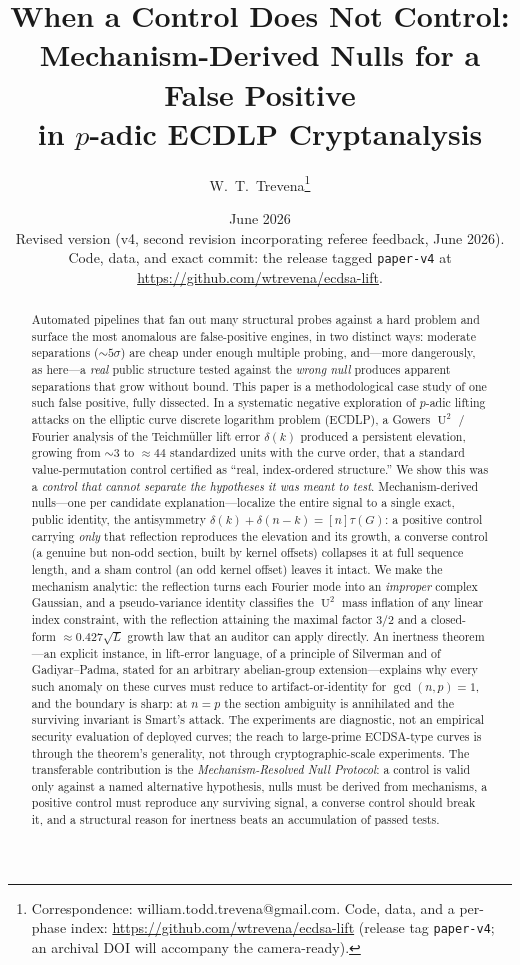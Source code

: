 \documentclass[11pt]{article}
\title{\bf When a Control Does Not Control:\\
Mechanism-Derived Nulls for a False Positive\\
in $p$-adic ECDLP Cryptanalysis}
\author{W.\ T.\ Trevena\thanks{Correspondence: william.todd.trevena@gmail.com.
Code, data, and a per-phase index:
\url{https://github.com/wtrevena/ecdsa-lift} (release tag
\texttt{paper-v4}; an archival DOI will accompany the camera-ready).}}
\date{June 2026\\[2pt]
{\small Revised version (v4, second revision incorporating referee
feedback, June 2026). Code, data, and exact commit: the release tagged
\texttt{paper-v4} at \url{https://github.com/wtrevena/ecdsa-lift}.}}
\theoremstyle{definition}
\DeclareMathOperator{\Uk}{U}
\begin{document}
\maketitle

\begin{abstract}
Automated pipelines that fan out many structural probes against a hard
problem and surface the most anomalous are false-positive engines, in two
distinct ways: moderate separations ($\sim$$5\sigma$) are cheap under
enough multiple probing, and---more dangerously, as here---a \emph{real}
public structure tested against the \emph{wrong null} produces apparent
separations that grow without bound. This paper is a methodological case
study of one such false positive, fully dissected. In a systematic
negative exploration of $p$-adic lifting attacks on the elliptic curve
discrete logarithm problem (ECDLP), a Gowers $\Uk^2$ / Fourier analysis
of the Teichm\"uller lift error $\delta(k)$ produced a persistent
elevation, growing from $\sim$$3$ to $\approx44$ standardized units with
the curve order, that a standard value-permutation control certified as
``real, index-ordered structure.'' We show this was a \emph{control that
cannot separate the hypotheses it was meant to test}. Mechanism-derived
nulls---one per candidate explanation---localize the entire signal to a
single exact, public identity, the antisymmetry
$\delta(k)+\delta(n-k)=[n]\tau(G)$: a positive control carrying
\emph{only} that reflection reproduces the elevation and its growth, a
converse control (a genuine but non-odd section, built by kernel offsets)
collapses it at full sequence length, and a sham control (an odd kernel
offset) leaves it intact. We make the mechanism analytic: the reflection
turns each Fourier mode into an \emph{improper} complex Gaussian, and a
pseudo-variance identity classifies the $\Uk^2$ mass inflation of any
linear index constraint, with the reflection attaining the maximal factor
$3/2$ and a closed-form $\approx0.427\sqrt L$ growth law that an auditor
can apply directly. An inertness theorem---an explicit instance, in
lift-error language, of a principle of Silverman and of Gadiyar--Padma,
stated for an arbitrary abelian-group extension---explains why every such
anomaly on these curves must reduce to artifact-or-identity for
$\gcd(n,p)=1$, and the boundary is sharp: at $n=p$ the section ambiguity
is annihilated and the surviving invariant is Smart's attack. The
experiments are diagnostic, not an empirical security evaluation of
deployed curves; the reach to large-prime ECDSA-type curves is through
the theorem's generality, not through cryptographic-scale experiments.
The transferable contribution is the \emph{Mechanism-Resolved Null
Protocol}: a control is valid only against a named alternative
hypothesis, nulls must be derived from mechanisms, a positive control
must reproduce any surviving signal, a converse control should break it,
and a structural reason for inertness beats an accumulation of passed
tests.
\end{abstract}
\end{document}
